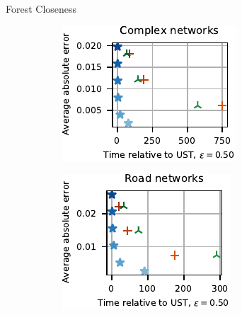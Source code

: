 \documentclass[10pt,titlepage,english,presentation]{beamer}
\begin{document}
\begin{frame}[t]{Forest Closeness}
\begin{figure}
\begin{subfigure}[t]{.5\textwidth}
\centering
\includegraphics[width=.6\textwidth]{../sources/plots/el-clos/avg-abs-small-diam-unweighted.pdf}
\end{subfigure}\hfill
\begin{subfigure}[t]{.5\textwidth}
\centering
\includegraphics[width=.6\textwidth]{../sources/plots/el-clos/avg-abs-high-diam-unweighted.pdf}
\end{subfigure}
\end{figure}
\end{frame}
\end{document}
